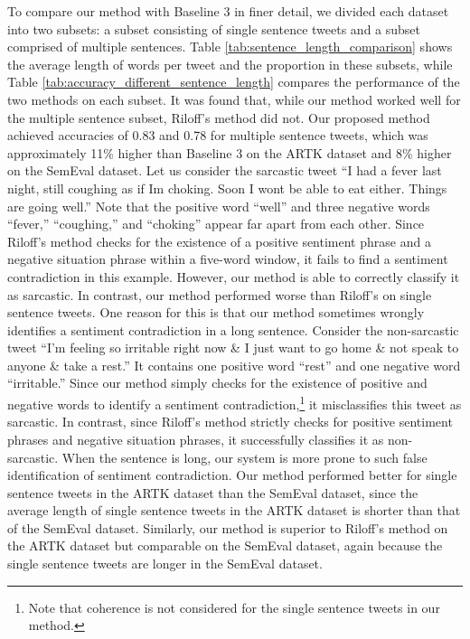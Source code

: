 \documentclass[english]{jnlp_1.4}
\begin{document}
To compare our method with Baseline 3 in finer detail, we divided each dataset into two subsets: a subset consisting of single sentence tweets and a subset comprised of multiple sentences.
Table \ref{tab:sentence_length_comparison} shows the average length of words per tweet and the proportion in these subsets, while Table \ref{tab:accuracy_different_sentence_length} compares the performance of the two methods on each subset.
It was found that, while our method worked well for the multiple sentence subset, Riloff's method did not.
Our proposed method achieved accuracies of 0.83 and 0.78 for multiple sentence tweets, which was approximately 11\% higher than Baseline 3 on the ARTK dataset and 8\% higher on the SemEval dataset.
Let us consider the sarcastic tweet ``I had a fever last night, still coughing as if Im choking. Soon I wont be able to eat either. Things are going well.''
Note that the positive word ``well'' and three negative words ``fever,'' ``coughing,'' and ``choking'' appear far apart from each other.
Since Riloff's method checks for the existence of a positive sentiment phrase and a negative situation phrase within a five-word window, it fails to find a sentiment contradiction in this example.
However, our method is able to correctly classify it as sarcastic.
In contrast, our method performed worse than Riloff's on single sentence tweets.
One reason for this is that our method sometimes wrongly identifies a sentiment contradiction in a long sentence.
Consider the non-sarcastic tweet ``I'm feeling so irritable right now \& I just want to go home \& not speak to anyone \& take a rest.''
It contains one positive word ``rest'' and one negative word ``irritable.''
Since our method simply checks for the existence of positive and negative words to identify a sentiment contradiction,\footnote{Note that coherence is not considered for the single sentence tweets in our method.} it misclassifies this tweet as sarcastic. In contrast, since Riloff's method strictly checks for positive sentiment phrases and negative situation phrases, it successfully classifies it as non-sarcastic.
When the sentence is long, our system is more prone to such false identification of sentiment contradiction.
Our method performed better for single sentence tweets in the ARTK dataset than the SemEval dataset, since the average length of single sentence tweets in the ARTK dataset is shorter than that of the SemEval dataset.
Similarly, our method is superior to Riloff's method on the ARTK dataset but comparable on the SemEval dataset, again because the single sentence tweets are longer in the SemEval dataset.
\end{document}
